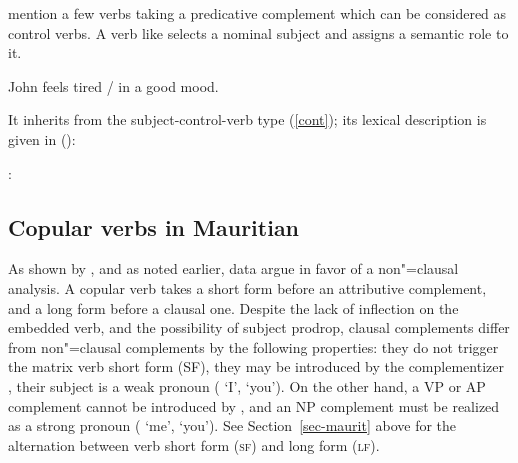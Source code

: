 \documentclass[output=paper
	        ,collection
	        ,collectionchapter
 	        ,biblatex
                ,babelshorthands
                ,newtxmath
                ,draftmode
                ,colorlinks, citecolor=brown
]{langscibook}
\begin{document}
\citet{PollardandSag1994}\addpages mention a few verbs taking a predicative complement which can be
considered as control verbs. A verb like  selects a nominal subject and assigns a
semantic role to it.

\begin{exe}
\ex John feels tired / in a good mood.
\end{exe}

\noindent
It inherits from the subject-control-verb type (\ref{cont}); its lexical description is given in ():

\eas
{}:\\
\zs


\subsection{Copular verbs in Mauritian}

As shown by \citet{HenriandLaurens2011}, and as noted earlier,  data
argue in favor
of a non"=clausal analysis. A copular verb takes a short form before an
attributive complement, and
a long form before a clausal one. Despite the lack of inflection on the embedded verb, and the
possibility of subject prodrop, clausal complements differ from non"=clausal complements by the
following properties: they do not trigger the matrix verb short form (SF), they may be introduced by
the complementizer , their subject is a weak pronoun ( `I',  `you'). On
the other hand, a VP or AP complement cannot be introduced by , and an NP complement must
be realized as a strong pronoun ( `me',  `you'). See Section~\ref{sec-maurit}
above for the alternation between verb short form (\textsc{sf}) and long form (\textsc{lf}).
\end{document}
